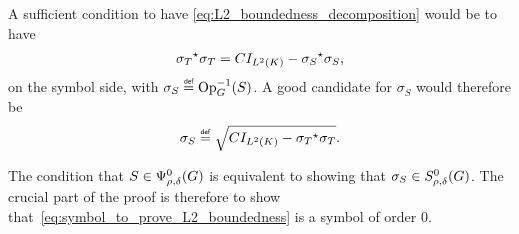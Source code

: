 A sufficient condition to have \eqref{eq:L2_boundedness_decomposition} would be to have
\begin{align*}
    {\sigma_T}^\star \sigma_T = C {I_{{L^{2} (K)}}} - {\sigma_S}^\star \sigma_S,
\end{align*}
on the symbol side,
with $\sigma_S \defeq \Op^{-1}(S)$.
A good candidate for $\sigma_S$ would therefore be
\begin{align}
    \sigma_S \defeq \sqrt{C \Id {\Lebesgue 2 \CompactGroup} - \adj {\sigma_T} \sigma_T}.
    \label{eq:symbol_to_prove_L2_boundedness}
\end{align}

The condition that $S \in \Psi^{0}_{\rho, \delta}(G)$ is equivalent to showing
that $\sigma_S \in S^{0}_{\rho, \delta}(G)$.
The crucial part of the proof is therefore to show that~\eqref{eq:symbol_to_prove_L2_boundedness} is a symbol of order $0$.

